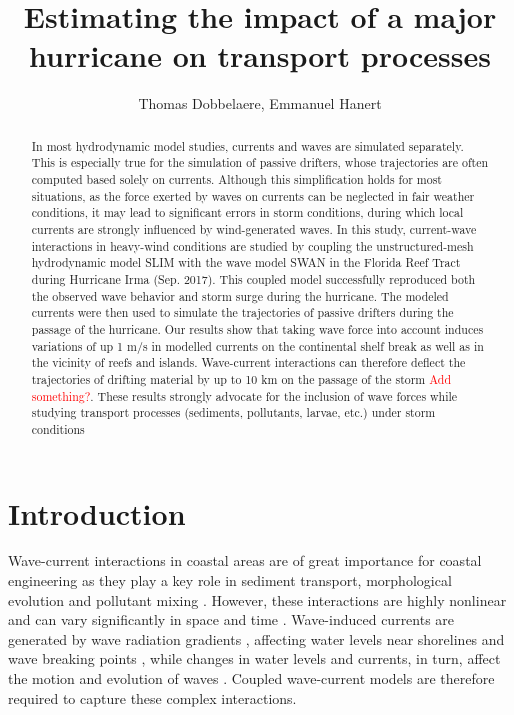 \documentclass[11pt,a4paper]{article}
\title{Estimating the impact of a major hurricane on transport processes}
\author{Thomas Dobbelaere, Emmanuel Hanert}
\begin{document}
\maketitle
\begin{abstract}
In most hydrodynamic model studies, currents and waves are simulated separately. This is especially true for the simulation of passive drifters, whose trajectories are often computed based solely on currents. Although this simplification holds for most situations, as the force exerted by waves on currents can be neglected in fair weather conditions, it may lead to significant errors in storm conditions, during which local currents are strongly influenced by wind-generated waves. In this study, current-wave interactions in heavy-wind conditions are studied by coupling the unstructured-mesh hydrodynamic model SLIM with the wave model SWAN in the Florida Reef Tract during Hurricane Irma (Sep. 2017). This coupled model successfully reproduced both the observed wave behavior and storm surge during the hurricane. The modeled currents were then used to simulate the trajectories of passive drifters during the passage of the hurricane. Our results show that taking wave force into account induces variations of up 1 m/s in modelled currents on the continental shelf break as well as in the vicinity of reefs and islands. Wave-current interactions can therefore deflect the trajectories of drifting material by up to 10 km on the passage of the storm \textcolor{red}{Add something?}. These results strongly advocate for the inclusion of wave forces while studying transport processes (sediments, pollutants, larvae, etc.) under storm conditions 

\end{abstract}

\section{Introduction}

Wave-current interactions in coastal areas are of great importance for coastal engineering as they play a key role in sediment transport, morphological evolution and pollutant mixing \citep{bever2013simulating, li1998three}. However, these interactions are highly nonlinear and can vary significantly in space and time \citep{wu2011fvcom}. Wave-induced currents are generated by wave radiation gradients \citep{longuet1970longshore}, affecting water levels near shorelines and wave breaking points \citep{longuet1964radiation}, while changes in water levels and currents, in turn, affect the motion and evolution of waves \citep{sikiric2013coupling}. Coupled wave-current models are therefore required to capture these complex interactions.
\end{document}
